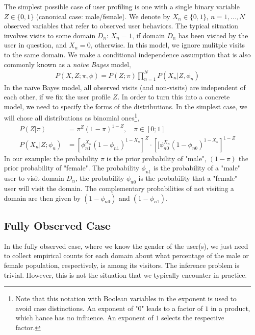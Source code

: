 \documentclass{article}
\begin{document}
The simplest possible case of user profiling is one with a single binary variable $Z \in \{0,1\}$ (canonical case: male/female). We denote by $X_n \in \{0,1\}$, $n=1,\dots,N$ observed variables that refer to observed user behaviors. The typical situation involves visits to some domain $D_n$: $X_n=1$, if domain $D_n$ has been visited by the user in question, and $X_n=0$, otherwise. In this model, we ignore mulitple visits to the same domain. We make a conditional independence assumption that is also commonly known as a \textit{na\"ive Bayes} model,
\begin{align}
\label{eq:model0} 
P(X,Z; \pi, \phi) = P(Z; \pi) \prod_{n=1}^N P(X_n|Z, \phi_n) 
\end{align}  
In the na\"ive Bayes model, all observed visits (and non-visits) are independent of each other, if we fix the user profile $Z$. In order to turn this into a concrete model, we need to specify the forms of the distributions. In the simplest case, we will chose all distributions as binomial ones\footnote{Note that this notation with Boolean variables in the exponent is used to avoid case distinctions. An exponent of "0" leads to a factor of $1$ in a product, which hance has no influence. An exponent of $1$ selects the respective factor.}, 
\begin{align}
P(Z| \pi) & = \pi^Z (1-\pi)^{1-Z}, \quad \pi \in [0;1]\\
P(X_n |Z; \phi_n) &= \left[ \phi_{n1}^{X_n} (1-\phi_{n1})^{1-X_n} \right]^Z \cdot \left[ [ \phi_{n0}^{X_n} (1-\phi_{n0})^{1-X_n} \right]^{1-Z}
\end{align}
In our example: the probability $\pi$ is the prior probability of "male", $(1-\pi)$ the prior probability of "female". The probability $\phi_{n1}$ is the probability of a "male" user to visit domain $D_n$, the probability $\phi_{n0}$ is the probability that a "female" user will visit the domain. The complementary probabilities of not visiting a domain are then given by $(1-\phi_{n0})$ and $(1-\phi_{n1})$. 

\subsection{Fully Observed Case}

In the fully observed case, where we know the gender of the user(s), we  just need to collect empirical counts for each domain about what percentage of the male or female population, respectively, is among its visitors. The inference problem is trivial. However, this is not the situation that we typically encounter in practice. 
\end{document}
